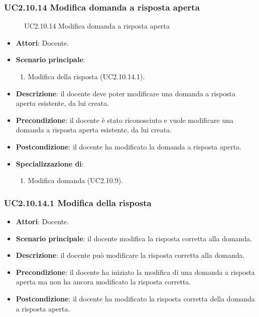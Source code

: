 \subsubsection{UC2.10.14 Modifica domanda a risposta aperta}
\begin{figure}[H]
\centering
\noindent{}
\caption{UC2.10.14 Modifica domanda a risposta aperta}
\end{figure}
\begin{itemize}
\item \textbf{Attori}: Docente.
\item \textbf{Scenario principale}:
\begin{enumerate}
\item Modifica della risposta (UC2.10.14.1).
\end{enumerate}
\item \textbf{Descrizione}: il docente deve poter modificare una domanda a risposta aperta esistente, da lui creata.
\item \textbf{Precondizione}: il docente è stato riconosciuto e vuole modificare una domanda a risposta aperta esistente, da lui creata.
\item \textbf{Postcondizione}: il docente ha modificato la domanda a risposta aperta.
\item \textbf{Specializzazione di}:
\begin{enumerate}
\item Modifica domanda (UC2.10.9).
\end{enumerate}
\end{itemize}
\subsubsection{UC2.10.14.1 Modifica della risposta}
\begin{itemize}
\item \textbf{Attori}: Docente.
\item \textbf{Scenario principale}: il docente modifica la risposta corretta alla domanda.
\item \textbf{Descrizione}: il docente può modificare la risposta corretta alla domanda.
\item \textbf{Precondizione}: il docente ha iniziato la modifica di una domanda a risposta aperta ma non ha ancora modificato la risposta corretta.
\item \textbf{Postcondizione}: il docente ha modificato la risposta corretta della domanda a risposta aperta.
\end{itemize}
